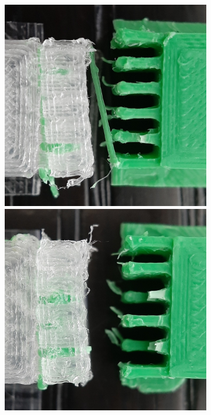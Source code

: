 \begin{figure}
	\setlength{\figwidth}{.19\columnwidth}
	\begin{subfigure}[B]{.99\columnwidth}
		\centering
		\includegraphics[width=\figwidth]{sources-testing-j1_cropped.jpg}
		\includegraphics[width=\figwidth]{sources-testing-j2_cropped.jpg}

\end{subfigure}
\end{figure}
